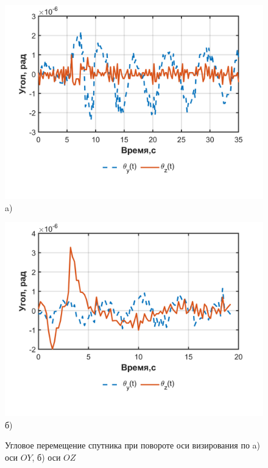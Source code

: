  
 \begin{figure}[!h]
 	\begin{minipage}[b][][b]{0.49\linewidth}\centering
 		\includegraphics[width=1\linewidth]{matlab/img/thetaY.png} \\ a)
 	\end{minipage}
 	\hfill
 	\begin{minipage}[b][][b]{0.49\linewidth}\centering
 		\includegraphics[width=1\linewidth]{matlab/img/thetaZ.png} \\ б)
 	\end{minipage}
 	\caption{Угловое перемещение спутника при повороте оси визирования по a) оси $OY$, б) оси $OZ$ }
 	\label{fig:theta}
 \end{figure}
 

